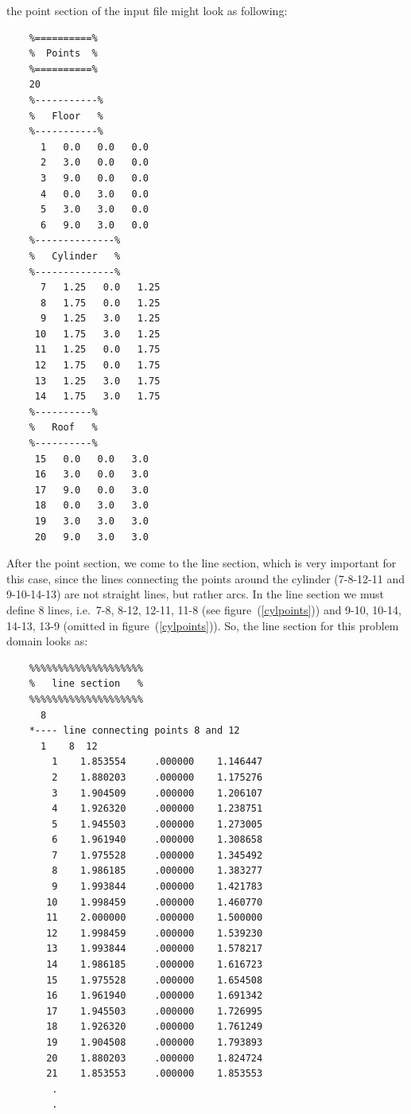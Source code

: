 \documentclass[10pt]{article}
\begin{document}
    the point section of the input file might look as following:
    \small
    \begin{verbatim}
    %==========%
    %  Points  %
    %==========%
    20
    %-----------%
    %   Floor   %
    %-----------%
      1   0.0   0.0   0.0
      2   3.0   0.0   0.0
      3   9.0   0.0   0.0
      4   0.0   3.0   0.0
      5   3.0   3.0   0.0
      6   9.0   3.0   0.0
    %--------------%
    %   Cylinder   %
    %--------------%
      7   1.25   0.0   1.25
      8   1.75   0.0   1.25
      9   1.25   3.0   1.25
     10   1.75   3.0   1.25
     11   1.25   0.0   1.75
     12   1.75   0.0   1.75
     13   1.25   3.0   1.75
     14   1.75   3.0   1.75
    %----------%
    %   Roof   %
    %----------%
     15   0.0   0.0   3.0
     16   3.0   0.0   3.0
     17   9.0   0.0   3.0
     18   0.0   3.0   3.0
     19   3.0   3.0   3.0
     20   9.0   3.0   3.0
    \end{verbatim}
    \normalsize
    After the point section, we come to the line section, which
    is very important for this case, since the lines connecting
    the points around the cylinder (7-8-12-11 and 9-10-14-13)
    are not straight lines, but rather arcs. In the line section
    we must define 8 lines, i.e.\ 7-8, 8-12, 12-11, 11-8 (see
    figure~(\ref{cylpoints})) and 9-10, 10-14, 14-13, 13-9 
    (omitted in figure~(\ref{cylpoints})). So, the line section for
    this problem domain looks as:
    \small
    \begin{verbatim}
    %%%%%%%%%%%%%%%%%%%%
    %   line section   %
    %%%%%%%%%%%%%%%%%%%%
      8
    *---- line connecting points 8 and 12 
      1    8  12
        1    1.853554     .000000    1.146447
        2    1.880203     .000000    1.175276
        3    1.904509     .000000    1.206107
        4    1.926320     .000000    1.238751
        5    1.945503     .000000    1.273005
        6    1.961940     .000000    1.308658
        7    1.975528     .000000    1.345492
        8    1.986185     .000000    1.383277
        9    1.993844     .000000    1.421783
       10    1.998459     .000000    1.460770
       11    2.000000     .000000    1.500000
       12    1.998459     .000000    1.539230
       13    1.993844     .000000    1.578217
       14    1.986185     .000000    1.616723
       15    1.975528     .000000    1.654508
       16    1.961940     .000000    1.691342
       17    1.945503     .000000    1.726995
       18    1.926320     .000000    1.761249
       19    1.904508     .000000    1.793893
       20    1.880203     .000000    1.824724
       21    1.853553     .000000    1.853553
        .
        . 
    \end{verbatim}
\end{document}
